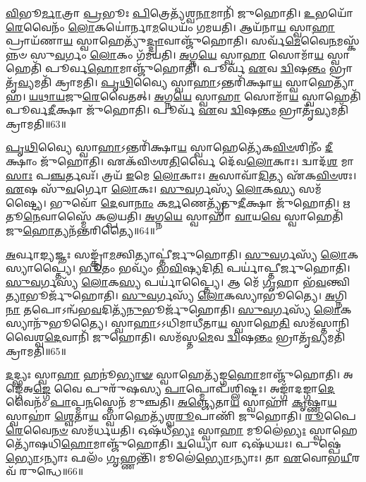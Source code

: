 \-\ul{𑌵𑌿}\-𑌭𑍂\-\ul{𑌰𑍍𑌮𑌾}\-𑌤𑍍𑌰𑌾 \ul{𑌪𑍍𑌰}\-𑌭𑍂𑌃 \ul{𑌪𑌿}\-𑌤𑍍𑌰𑍇𑌤𑍍𑌯᳴𑌶𑍍𑌵\-\ul{𑌨𑌾}\-𑌮𑌾𑌨𑌿᳴ 𑌜𑍁𑌹𑍋𑌤𑌿।
\-\ul{𑌉}\-𑌭𑌯𑍋᳴\-\ul{𑌰𑍇}\-𑌵𑍈𑌨𑌂᳴ \ul{𑌲𑍋}\-𑌕𑌯𑍋॑𑌰𑍍𑌨𑌾\-\ul{𑌮}\-𑌧𑍇𑌯𑌂᳴ 𑌗𑌮𑌯𑌤𑌿।
𑌆𑌯᳴𑌨𑌾\-\ul{𑌯} 𑌸𑍍𑌵𑌾\-\ul{𑌹𑌾} 𑌪𑍍𑌰𑌾𑌯᳴𑌣𑌾\-\ul{𑌯} 𑌸𑍍𑌵𑌾𑌹𑍇𑌤𑍍𑌯𑍁᳴\-\ul{𑌦𑍍𑌦𑍍𑌰𑌾}\-𑌵𑌾𑌞𑍍𑌜𑍁᳴𑌹𑍋𑌤𑌿।
𑌸𑌰𑍍𑌵᳴\-\ul{𑌮𑍇}\-𑌵𑍈\-\ul{𑌨}\-𑌮𑌸𑍍𑌕᳴𑌨𑍍𑌨𑍞 𑌸𑍁\-\ul{𑌵}\-𑌰𑍍𑌗𑌂 \ul{𑌲𑍋}\-𑌕𑌂 𑌗᳴𑌮𑌯𑌤𑌿।
\-\ul{𑌅}\-𑌗𑍍𑌨\-\ul{𑌯𑍇} 𑌸𑍍𑌵𑌾\-\ul{𑌹𑌾} 𑌸𑍋𑌮𑌾᳴\-\ul{𑌯} 𑌸𑍍𑌵𑌾𑌹𑍇𑌤𑌿᳴ 𑌪𑍂𑌰𑍍𑌵\-\ul{𑌹𑍋}\-𑌮𑌾𑌞𑍍𑌜𑍁᳴𑌹𑍋𑌤𑌿।
𑌪𑍂𑌰𑍍𑌵᳴ \ul{𑌏}\-𑌵 \ul{𑌦𑍍𑌵𑌿}\-𑌷\-\ul{𑌨𑍍𑌤𑌂} 𑌭𑍍𑌰𑌾𑌤𑍃᳴\-\ul{𑌵𑍍𑌯}\-𑌮𑌤𑌿᳴ 𑌕𑍍𑌰𑌾𑌮𑌤𑌿।
\-\ul{𑌪𑍃}\-\-\ul{𑌥𑌿}\-𑌵𑍍𑌯𑍈 𑌸𑍍𑌵𑌾\-\ul{𑌹𑌾}\-\-𑌽𑌨𑍍𑌤𑌰𑌿᳴𑌕𑍍𑌷𑌾\-\ul{𑌯} 𑌸𑍍𑌵𑌾𑌹𑍇𑌤𑍍𑌯𑌾᳴𑌹।
\-\ul{𑌯}\-\-\ul{𑌥𑌾}\-\-\ul{𑌯}\-𑌜𑍁\-\ul{𑌰𑍇}\-𑌵𑍈𑌤𑌤𑍍।
\-\ul{𑌅}\-𑌗𑍍𑌨\-\ul{𑌯𑍇} 𑌸𑍍𑌵𑌾\-\ul{𑌹𑌾} 𑌸𑍋𑌮𑌾᳴\-\ul{𑌯} 𑌸𑍍𑌵𑌾𑌹𑍇𑌤𑌿᳴ 𑌪𑍂𑌰𑍍𑌵\-\ul{𑌦𑍀}\-𑌕𑍍𑌷𑌾 𑌜𑍁᳴𑌹𑍋𑌤𑌿।
𑌪𑍂𑌰𑍍𑌵᳴ \ul{𑌏}\-𑌵 \ul{𑌦𑍍𑌵𑌿}\-𑌷\-\ul{𑌨𑍍𑌤𑌂} 𑌭𑍍𑌰𑌾𑌤𑍃᳴\-\ul{𑌵𑍍𑌯}\-𑌮𑌤𑌿᳴ 𑌕𑍍𑌰𑌾𑌮𑌤𑌿॥63॥

\-\ul{𑌪𑍃}\-\-\ul{𑌥𑌿}\-𑌵𑍍𑌯𑍈 𑌸𑍍𑌵𑌾\-\ul{𑌹𑌾}\-\-𑌽𑌨𑍍𑌤𑌰𑌿᳴𑌕𑍍𑌷𑌾\-\ul{𑌯} 𑌸𑍍𑌵𑌾𑌹𑍇𑌤𑍍𑌯𑍇᳴𑌕\-\ul{𑌵𑌿}\-\-\ul{𑍞}\-𑌶𑌿𑌨𑍀𑌂॑ \ul{𑌦𑍀}\-𑌕𑍍𑌷𑌾𑌂 𑌜𑍁᳴𑌹𑍋𑌤𑌿।
𑌏𑌕᳴𑌵𑌿𑍞𑌶\-\ul{𑌤𑌿}\-𑌰𑍍𑌵𑍈 𑌦𑍇᳴𑌵\-\ul{𑌲𑍋}\-𑌕𑌾𑌃।
𑌦𑍍𑌵𑌾𑌦᳴\-\ul{𑌶} 𑌮𑌾\-\ul{𑌸𑌾𑌃} 𑌪\-\ul{𑌞𑍍𑌚}\-𑌰𑍍𑌤𑌵𑌃᳴।
𑌤𑍍𑌰𑌯᳴ \ul{𑌇}\-𑌮𑍇 \ul{𑌲𑍋}\-𑌕𑌾𑌃।
\-\ul{𑌅}\-𑌸𑌾𑌵𑌾᳴\-\ul{𑌦𑌿}\-𑌤𑍍𑌯 𑌏᳴𑌕\-\ul{𑌵𑌿}\-\-\ul{𑍞}\-𑌶𑌃।
\-\ul{𑌏}\-𑌷 𑌸𑍁᳴\-\ul{𑌵}\-𑌰𑍍𑌗𑍋 \ul{𑌲𑍋}\-𑌕𑌃।
\-\ul{𑌸𑍁}\-\-\ul{𑌵}\-𑌰𑍍𑌗𑌸𑍍𑌯᳴ \ul{𑌲𑍋}\-𑌕\-\ul{𑌸𑍍𑌯} 𑌸𑌮᳴𑌷𑍍𑌟𑍍𑌯𑍈।
𑌭𑍁𑌵𑍋᳴ \ul{𑌦𑍇}\-𑌵𑌾\-\ul{𑌨𑌾𑌂} 𑌕\-\ul{𑌰𑍍𑌮}\-𑌣𑍇𑌤𑍍𑌯𑍃᳴𑌤𑍁\-\ul{𑌦𑍀}\-𑌕𑍍𑌷𑌾 𑌜𑍁᳴𑌹𑍋𑌤𑌿।
\-\ul{𑌋}\-𑌤𑍂\-\ul{𑌨𑍇}\-𑌵𑌾𑌸𑍍𑌮𑍈᳴ 𑌕𑌲𑍍𑌪𑌯𑌤𑌿।
\-\ul{𑌅}\-𑌗𑍍𑌨\-\ul{𑌯𑍇} 𑌸𑍍𑌵𑌾𑌹𑌾᳴ \ul{𑌵𑌾}\-𑌯\-\ul{𑌵𑍇} 𑌸𑍍𑌵𑌾𑌹𑍇𑌤𑌿᳴ 𑌜𑍁\-\ul{𑌹𑍋}\-𑌤𑍍𑌯𑌨᳴𑌨𑍍𑌤𑌰𑌿𑌤𑍍𑌯𑍈॥64॥

\-\ul{𑌅}\-𑌰𑍍𑌵𑌾\-\ul{𑌙𑍍𑌯}\-𑌜𑍍𑌞𑌃 𑌸𑌙𑍍𑌕𑍍𑌰𑌾᳴\-\ul{𑌮}\-𑌤𑍍𑌵𑌿𑌤𑍍𑌯𑌾𑌪𑍍𑌤𑍀॑𑌰𑍍𑌜𑍁𑌹𑍋𑌤𑌿।
\-\ul{𑌸𑍁}\-\-\ul{𑌵}\-𑌰𑍍𑌗𑌸𑍍𑌯᳴ \ul{𑌲𑍋}\-𑌕𑌸𑍍𑌯𑌾𑌪𑍍𑌤𑍍𑌯𑍈॑।
\-\ul{𑌭𑍂}\-𑌤𑌂 𑌭𑌵𑍍𑌯𑌂᳴ 𑌭\-\ul{𑌵𑌿}\-𑌷𑍍𑌯𑌦𑌿\-\ul{𑌤𑌿} 𑌪𑌰𑍍𑌯𑌾॑𑌪𑍍𑌤𑍀𑌰𑍍𑌜𑍁𑌹𑍋𑌤𑌿।
\-\ul{𑌸𑍁}\-\-\ul{𑌵}\-𑌰𑍍𑌗𑌸𑍍𑌯᳴ \ul{𑌲𑍋}\-𑌕\-\ul{𑌸𑍍𑌯} 𑌪𑌰𑍍𑌯𑌾॑𑌪𑍍𑌤𑍍𑌯𑍈।
𑌆 𑌮𑍇᳴ \ul{𑌗𑍃}\-𑌹𑌾 𑌭᳴\-\ul{𑌵}\-𑌨𑍍𑌤𑍍𑌵𑌿\-\ul{𑌤𑍍𑌯𑌾}\-𑌭𑍂𑌰𑍍𑌜𑍁᳴𑌹𑍋𑌤𑌿।
\-\ul{𑌸𑍁}\-\-\ul{𑌵}\-𑌰𑍍𑌗𑌸𑍍𑌯᳴ \ul{𑌲𑍋}\-𑌕𑌸𑍍𑌯𑌾𑌭𑍂॑𑌤𑍍𑌯𑍈।
\-\ul{𑌅}\-𑌗𑍍𑌨𑌿\-\ul{𑌨𑌾} 𑌤𑌪𑍋\-𑌽𑌨𑍍𑌵᳴𑌭\-\ul{𑌵}\-𑌦𑌿𑌤𑍍𑌯᳴\-\ul{𑌨𑍁}\-𑌭𑍂𑌰𑍍𑌜𑍁᳴𑌹𑍋𑌤𑌿।
\-\ul{𑌸𑍁}\-\-\ul{𑌵}\-𑌰𑍍𑌗𑌸𑍍𑌯᳴ \ul{𑌲𑍋}\-𑌕𑌸𑍍𑌯𑌾𑌨𑍁᳴𑌭𑍂𑌤𑍍𑌯𑍈।
𑌸𑍍𑌵𑌾\-\ul{𑌹𑌾}\-\-𑌽𑌽𑌧𑌿𑌮𑌾𑌧𑍀᳴𑌤𑌾\-\ul{𑌯} 𑌸𑍍𑌵𑌾𑌹𑍇\-\ul{𑌤𑌿} 𑌸𑌮᳴𑌸𑍍𑌤𑌾𑌨𑌿 𑌵𑍈𑌶𑍍𑌵\-\ul{𑌦𑍇}\-𑌵𑌾𑌨𑌿᳴ 𑌜𑍁𑌹𑍋𑌤𑌿।
𑌸𑌮᳴𑌸𑍍𑌤\-\ul{𑌮𑍇}\-𑌵 \ul{𑌦𑍍𑌵𑌿}\-𑌷\-\ul{𑌨𑍍𑌤𑌂} 𑌭𑍍𑌰𑌾𑌤𑍃᳴\-\ul{𑌵𑍍𑌯}\-𑌮𑌤𑌿᳴ 𑌕𑍍𑌰𑌾𑌮𑌤𑌿॥65॥

\-\ul{𑌦}\-𑌦𑍍𑌭𑍍𑌯𑌃 𑌸𑍍𑌵𑌾\-\ul{𑌹𑌾} 𑌹𑌨𑍂॑\-\ul{𑌭𑍍𑌯𑌾}\-\-\ul{𑍟} 𑌸𑍍𑌵𑌾𑌹𑍇𑌤𑍍𑌯᳴𑌙𑍍𑌗\-\ul{𑌹𑍋}\-𑌮𑌾𑌞𑍍𑌜𑍁᳴𑌹𑍋𑌤𑌿।
𑌅𑌙𑍍𑌗𑍇᳴𑌅\-\ul{𑌙𑍍𑌗𑍇} 𑌵𑍈 𑌪𑍁𑌰𑍁᳴𑌷𑌸𑍍𑌯 \ul{𑌪𑌾}\-𑌪𑍍𑌮𑍋𑌪᳴𑌶𑍍𑌲𑌿𑌷𑍍𑌟𑌃।
𑌅𑌙𑍍𑌗𑌾᳴𑌦𑌙𑍍𑌗𑌾\-\ul{𑌦𑍇}\-𑌵𑍈𑌨𑌂᳴ \ul{𑌪𑌾}\-𑌪𑍍𑌮\-\ul{𑌨}\-𑌸𑍍𑌤𑍇𑌨᳴ 𑌮𑍁𑌞𑍍𑌚𑌤𑌿।
\-\ul{𑌅}\-\-\ul{𑌞𑍍𑌜𑍍𑌯𑍇}\-𑌤𑌾\-\ul{𑌯} 𑌸𑍍𑌵𑌾𑌹𑌾᳴ \ul{𑌕𑍃}\-𑌷𑍍𑌣𑌾\-\ul{𑌯} 𑌸𑍍𑌵𑌾𑌹𑌾॑ \ul{𑌶𑍍𑌵𑍇}\-𑌤𑌾\-\ul{𑌯} 𑌸𑍍𑌵𑌾𑌹𑍇𑌤𑍍𑌯᳴𑌶𑍍𑌵\-\ul{𑌰𑍂}\-𑌪𑌾𑌣𑌿᳴ 𑌜𑍁𑌹𑍋𑌤𑌿।
\-\ul{𑌰𑍂}\-𑌪𑍈\-\ul{𑌰𑍇}\-𑌵𑍈\-\ul{𑌨}\-\-\ul{𑍞} 𑌸𑌮᳴𑌰𑍍𑌧𑌯𑌤𑌿।
𑌓𑌷᳴𑌧𑍀\-\ul{𑌭𑍍𑌯𑌃} 𑌸𑍍𑌵𑌾\-\ul{𑌹𑌾} 𑌮𑍂𑌲𑍇॑\-\ul{𑌭𑍍𑌯𑌃} 𑌸𑍍𑌵𑌾𑌹𑍇𑌤𑍍𑌯𑍋᳴𑌷𑌧𑌿\-\ul{𑌹𑍋}\-𑌮𑌾𑌞𑍍𑌜𑍁᳴𑌹𑍋𑌤𑌿।
\-\ul{𑌦𑍍𑌵}\-𑌯𑍍𑌯𑍋 𑌵𑌾 𑌓𑌷᳴𑌧𑌯𑌃।
𑌪𑍁𑌷𑍍𑌪𑍇॑\-\ul{𑌭𑍍𑌯𑍋}\-\-𑌽𑌨𑍍𑌯𑌾𑌃 𑌫𑌲𑌂᳴ \ul{𑌗𑍃}\-𑌹𑍍𑌣𑌨𑍍𑌤𑌿᳴।
𑌮𑍂𑌲𑍇॑\-\ul{𑌭𑍍𑌯𑍋}\-\-𑌽𑌨𑍍𑌯𑌾𑌃।
𑌤𑌾 \ul{𑌏}\-𑌵𑍋𑌭\-\ul{𑌯𑍀}\-𑌰𑌵᳴ 𑌰𑍁𑌨𑍍𑌧𑍇॥66॥


